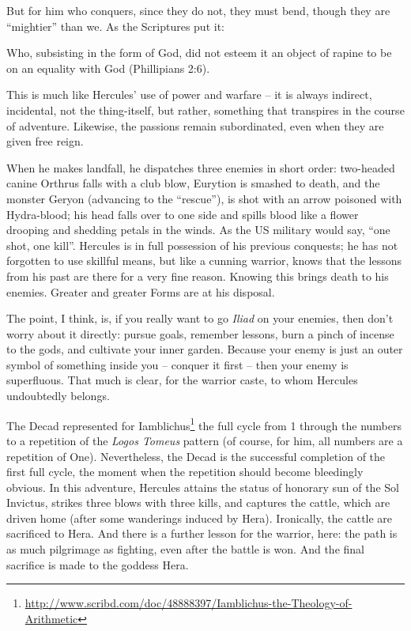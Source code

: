But for him who conquers, since they do not, they must bend, though they are ``mightier'' than we. As the Scriptures put it:

\begin{quotex}
Who, subsisting in the form of God, did not esteem it an object of rapine to be on an equality with God (Phillipians 2:6).
\end{quotex}


This is much like Hercules' use of power and warfare -- it is always indirect, incidental, not the thing-itself, but rather, something that transpires in the course of adventure. Likewise, the passions remain subordinated, even when they are given free reign.

When he makes landfall, he dispatches three enemies in short order: two-headed canine Orthrus falls with a club blow, Eurytion is smashed to death, and the monster Geryon (advancing to the ``rescue''), is shot with an arrow poisoned with Hydra-blood; his head falls over to one side and spills blood like a flower drooping and shedding petals in the winds. As the US military would say, ``one shot, one kill''. Hercules is in full possession of his previous conquests; he has not forgotten to use skillful means, but like a cunning warrior, knows that the lessons from his past are there for a very fine reason. Knowing this brings death to his enemies. Greater and greater Forms are at his disposal.

The point, I think, is, if you really want to go \emph{Iliad} on your enemies, then don't worry about it directly: pursue goals, remember lessons, burn a pinch of incense to the gods, and cultivate your inner garden. Because your enemy is just an outer symbol of something inside you -- conquer it first -- then your enemy is superfluous. That much is clear, for the warrior caste, to whom Hercules undoubtedly belongs.

The Decad represented for Iamblichus\footnote{\url{http://www.scribd.com/doc/48888397/Iamblichus-the-Theology-of-Arithmetic}} the full cycle from 1 through the numbers to a repetition of the
\emph{Logos Tomeus} pattern (of course, for him, all numbers are a repetition of One). Nevertheless, the Decad is the successful completion of the first full cycle, the moment when the repetition should become bleedingly obvious. In this adventure, Hercules attains the status of honorary sun of the Sol Invictus, strikes three blows with three kills, and captures the cattle, which are driven home (after some wanderings induced by Hera). Ironically, the cattle are sacrificed to Hera. And there is a further lesson for the warrior, here: the path is as much pilgrimage as fighting, even after the battle is won. And the final sacrifice is made to the goddess Hera.

